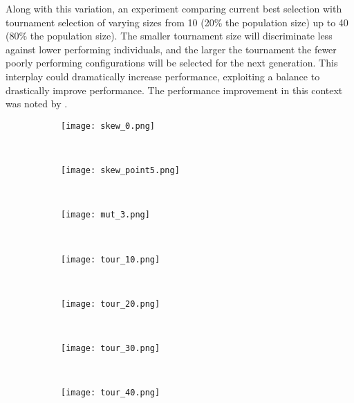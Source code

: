 Along with this variation, an experiment comparing current best
selection with tournament selection of varying sizes from 10 (20\% the population
size) up to 40 (80\% the population size). The smaller tournament size
will discriminate less against lower performing individuals, and the
larger the tournament the fewer poorly performing configurations will
be selected for the next generation. This interplay could dramatically
increase performance, exploiting a balance
to drastically improve performance. The performance improvement in this
context was noted by \cite{TournamentAdder}.

\begin{figure}
	\begin{minipage}{\textwidth}
	\centering
	\begin{subfigure}[ht]{0.32\textwidth}
		\texttt{[image: skew\_0.png]}
		\caption{}
		\label{fig:skew_0}
		\vspace{1em}
	\end{subfigure}
	~
	\begin{subfigure}[ht]{0.32\textwidth}
		\texttt{[image: skew\_point5.png]}
		\caption{}
		\label{fig:skew_point5}
		\vspace{1em}
	\end{subfigure}
	~
	\begin{subfigure}[ht]{0.32\textwidth}
		\texttt{[image: mut\_3.png]}
		\caption{}
		\label{fig:skew_1}
		\vspace{1em}
	\end{subfigure}
	~
	\begin{subfigure}[ht]{0.49\textwidth}
		\texttt{[image: tour\_10.png]}
		\caption{}
		\label{fig:tour_10}
		\vspace{1em}
	\end{subfigure}
	~
	\begin{subfigure}[ht]{0.49\textwidth}
		\texttt{[image: tour\_20.png]}
		\caption{}
		\label{fig:tour_20}
		\vspace{1em}
	\end{subfigure}
	~
	\begin{subfigure}[ht]{0.49\textwidth}
		\texttt{[image: tour\_30.png]}
		\caption{}
		\label{fig:tour_30}
		\vspace{1em}
	\end{subfigure}
	~
	\begin{subfigure}[ht]{0.49\textwidth}
		\texttt{[image: tour\_40.png]}
		\caption{}
		\label{fig:tour_40}

\end{subfigure}
\end{minipage}
\end{figure}
